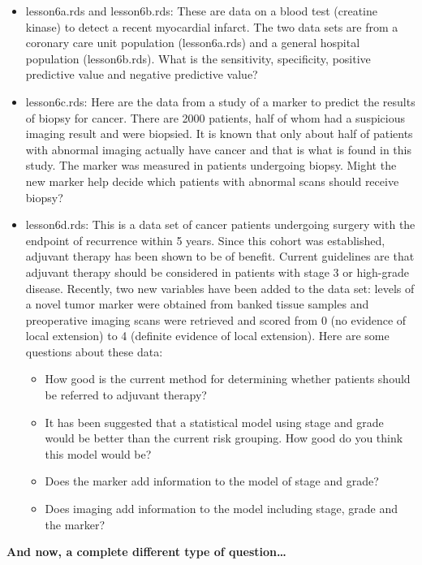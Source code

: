 \documentclass[]{book}
\providecommand{\tightlist}{%
  \setlength{\itemsep}{0pt}\setlength{\parskip}{0pt}}
\begin{document}
\begin{itemize}
\item
  lesson6a.rds and lesson6b.rds: These are data on a blood test
  (creatine kinase) to detect a recent myocardial infarct. The two data
  sets are from a coronary care unit population (lesson6a.rds) and a
  general hospital population (lesson6b.rds). What is the sensitivity,
  specificity, positive predictive value and negative predictive value?
\item
  lesson6c.rds: Here are the data from a study of a marker to predict
  the results of biopsy for cancer. There are 2000 patients, half of
  whom had a suspicious imaging result and were biopsied. It is known
  that only about half of patients with abnormal imaging actually have
  cancer and that is what is found in this study. The marker was
  measured in patients undergoing biopsy. Might the new marker help
  decide which patients with abnormal scans should receive biopsy?
\item
  lesson6d.rds: This is a data set of cancer patients undergoing surgery
  with the endpoint of recurrence within 5 years. Since this cohort was
  established, adjuvant therapy has been shown to be of benefit. Current
  guidelines are that adjuvant therapy should be considered in patients
  with stage 3 or high-grade disease. Recently, two new variables have
  been added to the data set: levels of a novel tumor marker were
  obtained from banked tissue samples and preoperative imaging scans
  were retrieved and scored from 0 (no evidence of local extension) to 4
  (definite evidence of local extension). Here are some questions about
  these data:

  \begin{itemize}
  \tightlist
  \item
    How good is the current method for determining whether patients
    should be referred to adjuvant therapy?
  \item
    It has been suggested that a statistical model using stage and grade
    would be better than the current risk grouping. How good do you
    think this model would be?
  \item
    Does the marker add information to the model of stage and grade?
  \item
    Does imaging add information to the model including stage, grade and
    the marker?
  \end{itemize}
\end{itemize}

\textbf{And now, a complete different type of question\ldots{}}
\end{document}
